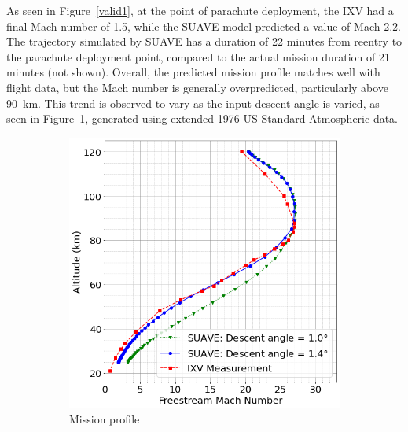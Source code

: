 \documentclass[%
 aip,
 amsmath,amssymb,
preprint,%
]{revtex4-1}
\begin{document}
As seen in Figure~\ref{valid1}, at the point of parachute deployment, the IXV had a final Mach number of 1.5, while the SUAVE model predicted a value of Mach 2.2. The trajectory simulated by SUAVE has a duration of 22 minutes from reentry to the parachute deployment point, compared to the actual mission duration of 21 minutes (not shown). Overall, the predicted mission profile matches well with flight data, but the Mach number is generally overpredicted, particularly above 90~km. This trend is observed to vary as the input descent angle is varied, as seen in Figure~\ref{valid2_1}, generated using extended 1976 US Standard Atmospheric data.
\begin{figure}[ht]
\centering
\begin{subfigure}[b]{0.49\textwidth}
\centering
\includegraphics[width=\textwidth]{IXV_mission_profile_1976_1.png}
\caption{Mission profile}
\label{valid2_1}
\end{subfigure}
~
\begin{subfigure}[b]{0.49\textwidth}
\centering

\end{subfigure}
\end{figure}
\end{document}
